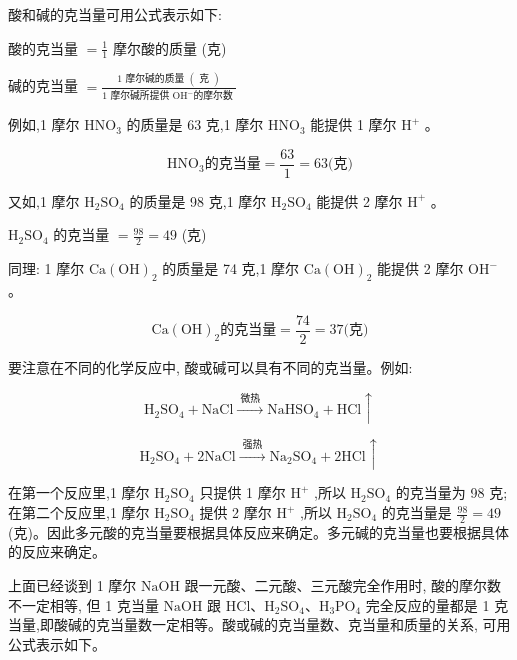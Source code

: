 \documentclass[10pt]{article}
\begin{document}
酸和碱的克当量可用公式表示如下:

酸的克当量 \(= \frac{1}{1}\) 摩尔酸的质量 (克)

碱的克当量 \(= \frac{1\text{ 摩尔碱的质量 }\left( \text{ 克 }\right) }{1\text{ 摩尔碱所提供 }{\mathrm{{OH}}}^{ - }\text{的摩尔数 }}\)

例如,1 摩尔 \({\mathrm{{HNO}}}_{3}\) 的质量是 63 克,1 摩尔 \({\mathrm{{HNO}}}_{3}\) 能提供 1 摩尔 \({\mathrm{H}}^{ + }\) 。

\[
{\mathrm{{HNO}}}_{3}\text{的克当量} = \frac{63}{1} = {63}\text{(克)}
\]

又如,1 摩尔 \({\mathrm{H}}_{2}{\mathrm{{SO}}}_{4}\) 的质量是 98 克,1 摩尔 \({\mathrm{H}}_{2}{\mathrm{{SO}}}_{4}\) 能提供 2 摩尔 \({\mathrm{H}}^{ + }\) 。

\({\mathrm{H}}_{2}{\mathrm{{SO}}}_{4}\) 的克当量 \(= \frac{98}{2} = {49}\) (克)

同理: 1 摩尔 \(\mathrm{{Ca}}{\left( \mathrm{{OH}}\right) }_{2}\) 的质量是 74 克,1 摩尔 \(\mathrm{{Ca}}{\left( \mathrm{{OH}}\right) }_{2}\) 能提供 2 摩尔 \({\mathrm{{OH}}}^{ - }\) 。

\[
\mathrm{{Ca}}{\left( \mathrm{{OH}}\right) }_{2}\text{的克当量} = \frac{74}{2} = {37}\text{(克)}
\]

要注意在不同的化学反应中, 酸或碱可以具有不同的克当量。例如:

\[
{\mathrm{H}}_{2}{\mathrm{{SO}}}_{4} + \mathrm{{NaCl}}\xrightarrow[]{\text{ 微热 }}{\mathrm{{NaHSO}}}_{4} + \mathrm{{HCl}} \uparrow
\]

\[
{\mathrm{H}}_{2}{\mathrm{{SO}}}_{4} + 2\mathrm{{NaCl}}\xrightarrow[]{\text{ 强热 }}{\mathrm{{Na}}}_{2}{\mathrm{{SO}}}_{4} + 2\mathrm{{HCl}} \uparrow
\]

在第一个反应里,1 摩尔 \({\mathrm{H}}_{2}{\mathrm{{SO}}}_{4}\) 只提供 1 摩尔 \({\mathrm{H}}^{ + }\) ,所以 \({\mathrm{H}}_{2}{\mathrm{{SO}}}_{4}\) 的克当量为 98 克; 在第二个反应里,1 摩尔 \({\mathrm{H}}_{2}{\mathrm{{SO}}}_{4}\) 提供 2 摩尔 \({\mathrm{H}}^{ + }\) ,所以 \({\mathrm{H}}_{2}{\mathrm{{SO}}}_{4}\) 的克当量是 \(\frac{98}{2} = {49}\) (克)。因此多元酸的克当量要根据具体反应来确定。多元碱的克当量也要根据具体的反应来确定。

上面已经谈到 1 摩尔 \(\mathrm{{NaOH}}\) 跟一元酸、二元酸、三元酸完全作用时, 酸的摩尔数不一定相等, 但 1 克当量 \(\mathrm{{NaOH}}\) 跟 \(\mathrm{{HCl}}\text{、}{\mathrm{H}}_{2}{\mathrm{{SO}}}_{4}\text{、}{\mathrm{H}}_{3}{\mathrm{{PO}}}_{4}\) 完全反应的量都是 1 克当量,即酸碱的克当量数一定相等。酸或碱的克当量数、克当量和质量的关系, 可用公式表示如下。
\end{document}
